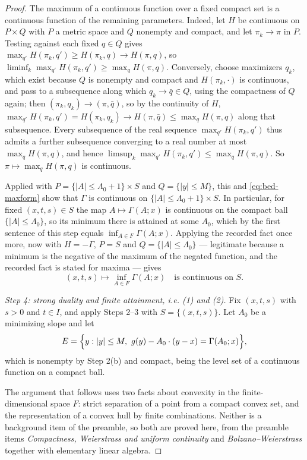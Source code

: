 \begin{proof}
The maximum of a continuous function over a fixed compact set is a continuous
function of the remaining parameters. Indeed, let $H$ be continuous on
$P\times Q$ with $P$ a metric space and $Q$ nonempty and compact, and let
$\pi_k\to\pi$ in $P$. Testing against each fixed $q\in Q$ gives
$\max_{q'}H(\pi_k,q')\ge H(\pi_k,q)\to H(\pi,q)$, so
$\liminf_k\max_{q'}H(\pi_k,q')\ge\max_{q}H(\pi,q)$. Conversely, choose
maximizers $q_k$, which exist because $Q$ is nonempty and compact and
$H(\pi_k,\cdot)$ is continuous, and pass to a subsequence along which
$q_k\to\bar q\in Q$, using the compactness of $Q$ again; then
$(\pi_k,q_k)\to(\pi,\bar q)$, so by the continuity of $H$,
$\max_{q'}H(\pi_k,q')=H(\pi_k,q_k)\to H(\pi,\bar q)\le\max_qH(\pi,q)$ along that
subsequence. Every subsequence of the real sequence $\max_{q'}H(\pi_k,q')$ thus
admits a further subsequence converging to a real number at most
$\max_qH(\pi,q)$, and hence
$\limsup_k\max_{q'}H(\pi_k,q')\le\max_qH(\pi,q)$. So
$\pi\mapsto\max_qH(\pi,q)$ is continuous.

Applied with $P=\{|A|\le\Lambda_0+1\}\times S$ and $Q=\{|y|\le M\}$, this and
\eqref{eq:bed-maxform} show that $\Gamma$ is continuous on
$\{|A|\le\Lambda_0+1\}\times S$. In particular, for fixed $(x,t,s)\in S$ the map
$A\mapsto\Gamma(A;x)$ is continuous on the compact ball $\{|A|\le\Lambda_0\}$,
so its minimum there is attained at some $A_0$, which by the first sentence of
this step equals $\inf_{A\in F}\Gamma(A;x)$. Applying the recorded fact once
more, now with $H=-\Gamma$, $P=S$ and $Q=\{|A|\le\Lambda_0\}$ — legitimate
because a minimum is the negative of the maximum of the negated function, and
the recorded fact is stated for maxima — gives
\begin{equation}\label{eq:bed-cont}
  (x,t,s)\longmapsto\inf_{A\in F}\Gamma(A;x)
  \quad\text{is continuous on }S .
\end{equation}

\emph{Step 4: strong duality and finite attainment, i.e. (1) and (2).}
Fix $(x,t,s)$ with $s>0$ and $t\in I$, and apply Steps 2--3 with
$S=\{(x,t,s)\}$. Let $A_0$ be a minimizing slope and let
\[
  E=\Bigl\{y:|y|\le M,\ g(y)-A_0\cdot(y-x)=\Gamma(A_0;x)\Bigr\},
\]
which is nonempty by Step 2(b) and compact, being the level set of a continuous
function on a compact ball.

The argument that follows uses two facts about convexity in the
finite-dimensional space $F$: strict separation of a point from a compact convex
set, and the representation of a convex hull by finite combinations. Neither is
a background item of the preamble, so both are proved here, from the preamble
items \emph{Compactness, Weierstrass and uniform continuity} and
\emph{Bolzano--Weierstrass} together with elementary linear algebra.


\end{proof}
